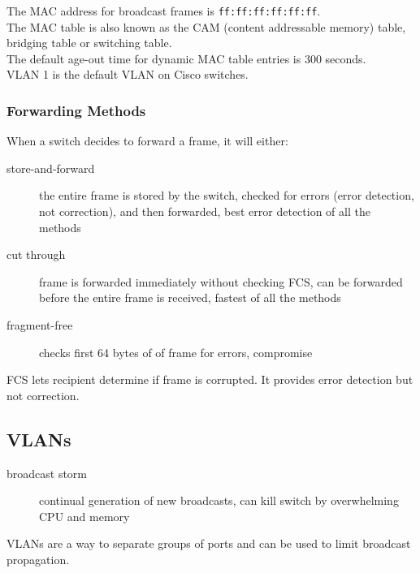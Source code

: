 The MAC address for broadcast frames is \texttt{ff:ff:ff:ff:ff:ff}.\\

The MAC table is also known as the CAM (content addressable memory) table,
bridging table or switching table.\\

The default age-out time for dynamic MAC table entries is 300 seconds.\\

VLAN 1 is the default VLAN on Cisco switches.

\subsubsection{Forwarding Methods}

When a switch decides to forward a frame, it will either:

\begin{description}

\item[store-and-forward]
the entire frame is stored by the switch, checked for errors (error detection,
not correction), and then forwarded, best error detection of all the methods

\item[cut through]
frame is forwarded immediately without checking FCS, can be forwarded before
the entire frame is received, fastest of all the methods

\item[fragment-free]
checks first 64 bytes of of frame for errors, compromise


\end{description}

FCS lets recipient determine if frame is corrupted. It provides error
detection but not correction.

\subsection{VLANs}

\begin{description}

\item[broadcast storm]
continual generation of new broadcasts, can kill switch by overwhelming
CPU and memory

\end{description}

VLANs are a way to separate groups of ports and can be used to limit broadcast
propagation.\\

